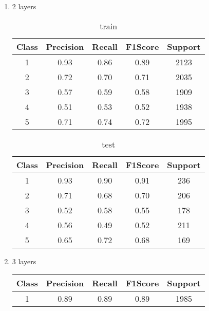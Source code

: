 \begin{enumerate}[label=(\alph*)]
\begin{enumerate}[label=\roman*.]
\begin{table}[!htb]
            \caption{test}
            \label{part c test depth 1}
        \end{table}
        \item 2 layers
        \begin{table}[!htb]
            \centering
            \begin{tabular}{ccccc}
            \hline
            Class & Precision & Recall & F1Score & Support \\ \hline
            1     & 0.93      & 0.86   & 0.89    & 2123    \\
            2     & 0.72      & 0.70   & 0.71    & 2035    \\
            3     & 0.57      & 0.59   & 0.58    & 1909    \\
            4     & 0.51      & 0.53   & 0.52    & 1938    \\
            5     & 0.71      & 0.74   & 0.72    & 1995    \\ \hline
            \end{tabular}
            \caption{train}
            \label{part c train depth 2}
        \end{table}
        \begin{table}[!htb]
            \centering
            \begin{tabular}{ccccc}
            \hline
            Class & Precision & Recall & F1Score & Support \\ \hline
            1     & 0.93      & 0.90   & 0.91    & 236     \\
            2     & 0.71      & 0.68   & 0.70    & 206     \\
            3     & 0.52      & 0.58   & 0.55    & 178     \\
            4     & 0.56      & 0.49   & 0.52    & 211     \\
            5     & 0.65      & 0.72   & 0.68    & 169     \\ \hline
            \end{tabular}
            \caption{test}
            \label{part c test depth 2}
        \end{table}
        \newpage
        \item 3 layers
        \begin{table}[!htb]
            \centering
            \begin{tabular}{ccccc}
            \hline
            Class & Precision & Recall & F1Score & Support \\ \hline
            1     & 0.89      & 0.89   & 0.89    & 1985    \\

\end{tabular}
\end{table}
\end{enumerate}
\end{enumerate}
